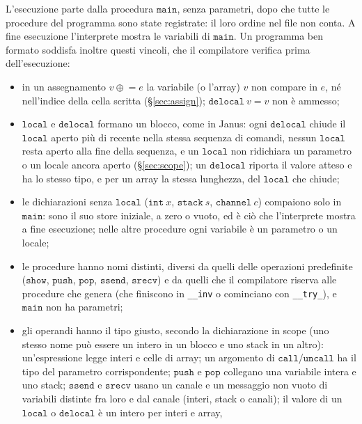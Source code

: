 \medskip
\noindent
L'esecuzione parte dalla procedura $\mathtt{main}$, senza parametri, dopo che
tutte le procedure del programma sono state registrate: il loro ordine nel file
non conta. A fine esecuzione l'interprete mostra le variabili di
$\mathtt{main}$. Un programma ben formato soddisfa inoltre questi vincoli,
che il compilatore verifica prima dell'esecuzione:
\begin{itemize}
  \item in un assegnamento $v \mathrel{\oplus}= e$ la variabile (o l'array) $v$
    non compare in $e$, né nell'indice della cella scritta
    (\S\ref{sec:assign}); $\mathtt{delocal}\ v = v$ non è ammesso;
  \item $\mathtt{local}$ e $\mathtt{delocal}$ formano un blocco, come in Janus:
    ogni $\mathtt{delocal}$ chiude il $\mathtt{local}$ aperto più di recente
    nella stessa sequenza di comandi, nessun $\mathtt{local}$ resta aperto alla
    fine della sequenza, e un $\mathtt{local}$ non ridichiara un parametro o un
    locale ancora aperto (\S\ref{sec:scope}); un $\mathtt{delocal}$ riporta il
    valore atteso e ha lo stesso tipo, e per un array la stessa lunghezza, del
    $\mathtt{local}$ che chiude;
  \item le dichiarazioni senza $\mathtt{local}$ ($\mathtt{int}\ x$,
    $\mathtt{stack}\ s$, $\mathtt{channel}\ c$) compaiono solo in
    $\mathtt{main}$: sono il suo store iniziale, a zero o vuoto, ed è ciò che
    l'interprete mostra a fine esecuzione; nelle altre procedure ogni variabile
    è un parametro o un locale;
  \item le procedure hanno nomi distinti, diversi da quelli delle operazioni
    predefinite ($\mathtt{show}$, $\mathtt{push}$, $\mathtt{pop}$,
    $\mathtt{ssend}$, $\mathtt{srecv}$) e da quelli che il compilatore riserva
    alle procedure che genera (che finiscono in \texttt{\_\_inv} o cominciano
    con \texttt{\_\_try\_}), e $\mathtt{main}$ non ha parametri;
  \item gli operandi hanno il tipo giusto, secondo la dichiarazione in scope
    (uno stesso nome può essere un intero in un blocco e uno stack in un
    altro): un'espressione legge interi e celle di array; un argomento di
    $\mathtt{call}$/$\mathtt{uncall}$ ha il tipo del parametro corrispondente;
    $\mathtt{push}$ e $\mathtt{pop}$ collegano una variabile intera e uno
    stack; $\mathtt{ssend}$ e $\mathtt{srecv}$ usano un canale e un messaggio
    non vuoto di variabili distinte fra loro e dal canale (interi, stack o
    canali); il valore di un
    $\mathtt{local}$ o $\mathtt{delocal}$ è un intero per interi e array,

\end{itemize}
